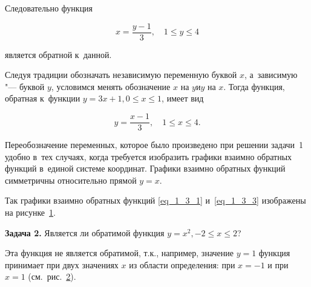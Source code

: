Следовательно функция

\begin{equation}\label{eq_1_3_2}
\displaystyle x = \frac{y-1}{3}, \quad 1 \leqslant y \leqslant 4
\end{equation}

является обратной к~данной.

Следуя традиции обозначать независимую переменную буквой $x$,
а~зависимую "--- буквой $y$, условимся менять обозначение $x$ на $y \text{и} y$ на $x$.
Тогда функция, обратная к~функции $y = 3x + 1, 0 \leqslant x \leqslant 1$,
имеет вид

\begin{equation}\label{eq_1_3_3}
\displaystyle y = \frac{x-1}{3}, \quad 1 \leqslant x \leqslant 4.
\end{equation}

Переобозначение переменных, которое было произведено при решении задачи~1
удобно в~тех случаях, когда требуется изобразить графики взаимно обратных функций
в~единой системе координат. Графики взаимно обратных функций симметричны
относительно прямой $y = x$.

Так графики взаимно обратных функций \eqref{eq_1_3_1} и~\eqref{eq_1_3_3}
изображены на рисунке~\ref{fig_1_3_8}.

\begin{figure}\label{fig_1_3_8}
\end{figure}

\textbf{Задача 2.} Является ли обратимой функция
$y = x^{2}, -2 \leqslant x \leqslant 2$?

Эта функция не является обратимой, т.к., например, значение $y = 1$
функция принимает при двух значениях $x$ из области определения:
при $x = -1$ и при $x = 1$ (см.\ рис.\ \ref{fig_1_3_9}).

\begin{figure}\label{fig_1_3_9}
\end{figure}

